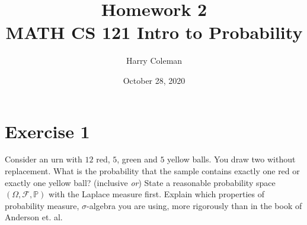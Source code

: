 \documentclass[12pt]{article}
\newenvironment{problem}
    {\begin{lrbox}{\mybox}\begin{minipage}{\textwidth-10pt}}
    {\end{minipage}\end{lrbox}\framebox[6.5in]{\usebox{\mybox}}}
\newcommand{\FF}{\mathcal{F}}
\renewcommand{\P}{\mathbb{P}}
\begin{document}
 
\title{Homework 2\\
    \large MATH CS 121 Intro to Probability
}
\author{Harry Coleman}
\date{October 28, 2020}
\maketitle

\section*{Exercise 1}
\begin{problem}
    Consider an urn with $12$ red, $5$, green and $5$ yellow balls. You draw two without replacement. What is the probability that the sample contains exactly one red or exactly one yellow ball? (inclusive \emph{or}) State a reasonable probability space $(\Omega, \FF, \P)$ with the Laplace measure first. Explain which properties of probability measure, $\sigma$-algebra you are using, more rigorously than in the book of Anderson et. al.
\end{problem}
\paragraph{}
\end{document}
